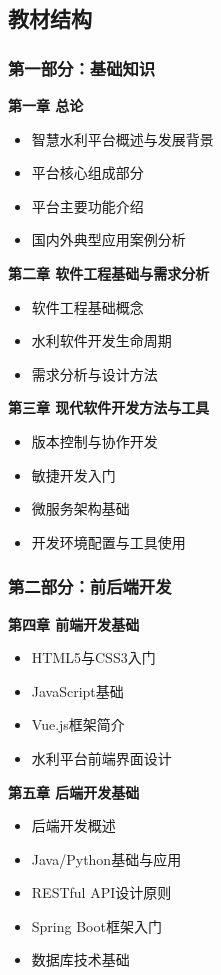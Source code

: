 \subsection{教材结构}\label{ux6559ux6750ux7ed3ux6784}
\subsubsection{第一部分：基础知识}\label{ux7b2cux4e00ux90e8ux5206ux57faux7840ux77e5ux8bc6} \textbf{第一章 总论} \begin{itemize}
\tightlist \item 智慧水利平台概述与发展背景 \item 平台核心组成部分 \item 平台主要功能介绍 \item 国内外典型应用案例分析 \end{itemize} \textbf{第二章 软件工程基础与需求分析}
\begin{itemize} \tightlist \item 软件工程基础概念 \item 水利软件开发生命周期 \item 需求分析与设计方法 \end{itemize} \textbf{第三章 现代软件开发方法与工具}
\begin{itemize} \tightlist \item 版本控制与协作开发 \item 敏捷开发入门 \item 微服务架构基础 \item 开发环境配置与工具使用 \end{itemize}
\subsubsection{第二部分：前后端开发}\label{ux7b2cux4e8cux90e8ux5206ux524dux540eux7aefux5f00ux53d1} \textbf{第四章 前端开发基础}
\begin{itemize} \tightlist \item HTML5与CSS3入门 \item JavaScript基础 \item Vue.js框架简介 \item 水利平台前端界面设计 \end{itemize}
\textbf{第五章 后端开发基础} \begin{itemize} \tightlist \item 后端开发概述 \item Java/Python基础与应用 \item RESTful API设计原则 \item Spring
Boot框架入门 \item 数据库技术基础 \end{itemize}
